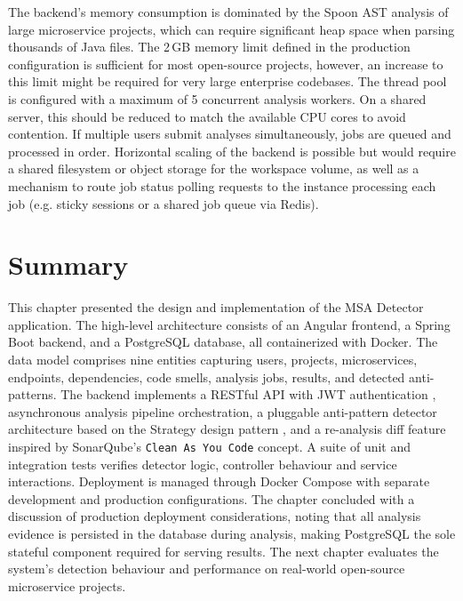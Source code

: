  \par The backend's memory consumption is dominated by the Spoon AST analysis of large microservice projects, which can require significant heap space when parsing thousands of Java files. The 2\,GB memory limit defined in the production configuration is sufficient for most open-source projects, however, an increase to this limit might be required for very large enterprise codebases. The thread pool is configured with a maximum of 5 concurrent analysis workers. On a shared server, this should be reduced to match the available CPU cores to avoid contention. If multiple users submit analyses simultaneously, jobs are queued and processed in order. Horizontal scaling of the backend is possible but would require a shared filesystem or object storage for the workspace volume, as well as a mechanism to route job status polling requests to the instance processing each job (e.g. sticky sessions or a shared job queue via Redis).

\section{Summary}
\label{sec:ch4-summary}

\par This chapter presented the design and implementation of the MSA Detector application. The high-level architecture consists of an Angular frontend, a Spring Boot backend, and a PostgreSQL database, all containerized with Docker. The data model comprises nine entities capturing users, projects, microservices, endpoints, dependencies, code smells, analysis jobs, results, and detected anti-patterns. The backend implements a RESTful API \cite{Fielding2000} with JWT authentication \cite{RFC7519}, asynchronous analysis pipeline orchestration, a pluggable anti-pattern detector architecture based on the Strategy design pattern \cite{Gamma1994}, and a re-analysis diff feature inspired by SonarQube's \texttt{Clean As You Code} concept. A suite of unit and integration tests verifies detector logic, controller behaviour and service interactions. Deployment is managed through Docker Compose with separate development and production configurations. The chapter concluded with a discussion of production deployment considerations, noting that all analysis evidence is persisted in the database during analysis, making PostgreSQL the sole stateful component required for serving results. The next chapter evaluates the system's detection behaviour and performance on real-world open-source microservice projects.
